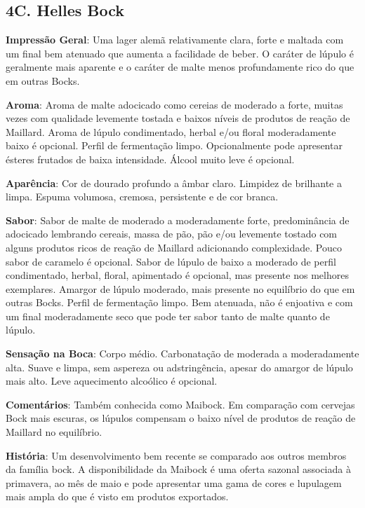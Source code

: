 \subsection*{4C. Helles Bock}
\textbf{Impressão Geral}: Uma lager alemã relativamente clara, forte e maltada com um final bem atenuado que aumenta a facilidade de beber. O caráter de lúpulo é geralmente mais aparente e o caráter de malte menos profundamente rico do que em outras Bocks.

\textbf{Aroma}: Aroma de malte adocicado como cereias de moderado a forte, muitas vezes com qualidade levemente tostada e baixos níveis de produtos de reação de Maillard. Aroma de lúpulo condimentado, herbal e/ou floral moderadamente baixo é opcional. Perfil de fermentação limpo. Opcionalmente pode apresentar ésteres frutados de baixa intensidade. Álcool muito leve é opcional.

\textbf{Aparência}: Cor de dourado profundo a âmbar claro. Limpidez de brilhante a limpa. Espuma volumosa, cremosa, persistente e de cor branca.

\textbf{Sabor}: Sabor de malte de moderado a moderadamente forte, predominância de adocicado lembrando cereais, massa de pão, pão e/ou levemente tostado com alguns produtos ricos de reação de Maillard adicionando complexidade. Pouco sabor de caramelo é opcional. Sabor de lúpulo de baixo a moderado de perfil condimentado, herbal, floral, apimentado é opcional, mas presente nos melhores exemplares. Amargor de lúpulo moderado, mais presente no equilíbrio do que em outras Bocks. Perfil de fermentação limpo. Bem atenuada, não é enjoativa e com um final moderadamente seco que pode ter sabor tanto de malte quanto de lúpulo.

\textbf{Sensação na Boca}: Corpo médio. Carbonatação de moderada a moderadamente alta. Suave e limpa, sem aspereza ou adstringência, apesar do amargor de lúpulo mais alto. Leve aquecimento alcoólico é opcional.

\textbf{Comentários}: Também conhecida como Maibock. Em comparação com cervejas Bock mais escuras, os lúpulos compensam o baixo nível de produtos de reação de Maillard no equilíbrio.

\textbf{História}: Um desenvolvimento bem recente se comparado aos outros membros da família bock. A disponibilidade da Maibock é uma oferta sazonal associada à primavera, ao mês de maio e pode apresentar uma gama de cores e lupulagem mais ampla do que é visto em produtos exportados.

